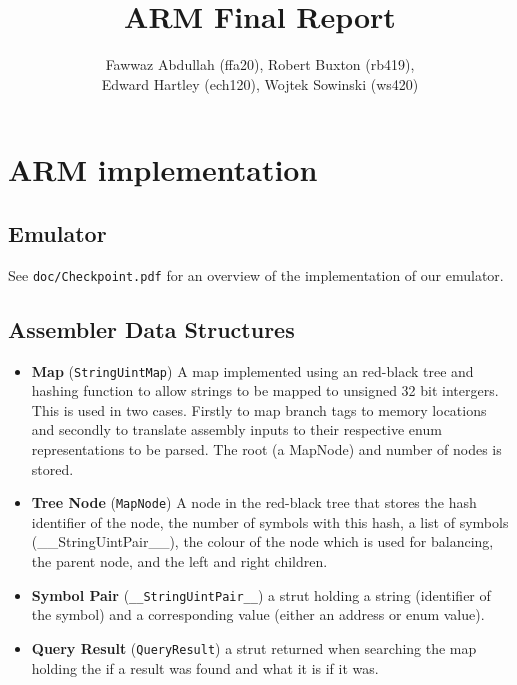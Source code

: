 \documentclass[8pt]{article}
\begin{document}
\title{ARM Final Report}
\author{Fawwaz Abdullah (ffa20), Robert Buxton (rb419), \\Edward Hartley (ech120), Wojtek Sowinski (ws420) }

\maketitle

\section{ARM implementation}

\subsection{Emulator}
See \texttt{doc/Checkpoint.pdf} for an overview of the implementation of our 
emulator.
 
\subsection{Assembler Data Structures}

\begin{itemize}

    \item \textbf{Map} (\texttt{StringUintMap}) A map implemented using an
    red-black tree and hashing function to allow strings to be mapped to unsigned
    32 bit intergers. This is used in two cases. Firstly to map branch tags to 
    memory locations and secondly to translate assembly inputs to their respective
    enum representations to be parsed. The root (a MapNode) and number of nodes is stored.
    
    \item \textbf{Tree Node} (\texttt{MapNode}) A node in the red-black tree that 
    stores the hash identifier of the node, the number of symbols with this hash, 
    a list of symbols (\_\_StringUintPair\_\_), the colour of the node which is used for balancing, the 
    parent node, and the left and right children.

    \item \textbf{Symbol Pair} (\texttt{\_\_StringUintPair\_\_}) a strut holding a
    string (identifier of the symbol) and a corresponding value (either an 
    address or enum value). 

    
    \item \textbf{Query Result} (\texttt{QueryResult}) a strut returned when searching the map
    holding the if a result was found and what it is if it was.
    
    \end{itemize}
\end{document}

